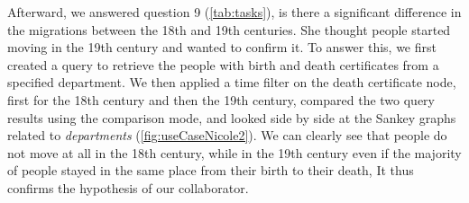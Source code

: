 Afterward, we answered question 9 (\autoref{tab:tasks}), \ie is there a significant difference in the migrations between the 18th and 19th centuries.
She thought people started moving in the 19th century and wanted to confirm it.
To answer this, we first created a query to retrieve the people with birth and death certificates from a specified department.
We then applied a time filter on the death certificate node, first for the 18th century and then the 19th century, compared the two query results using the comparison mode, and looked side by side at the Sankey graphs related to \textit{departments} (\autoref{fig:useCaseNicole2}).
We can clearly see that people do not move at all in the 18th century, while in the 19th century even if the majority of people stayed in the same place from their birth to their death, 
It thus confirms the hypothesis of our collaborator.

